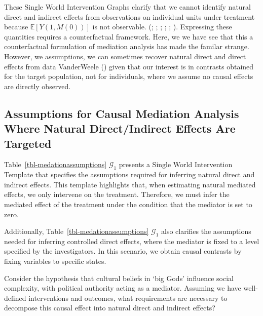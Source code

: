 \documentclass[
  single column]{article}
\begin{document}
These Single World Intervention Graphs clarify that we cannot identify
natural direct and indirect effects from observations on individual
units under treatment because \(\mathbb{E}[Y(1, M(0))]\) is not
observable. (;
;
;
;
;
).
Expressing these quantities requires a counterfactual framework. Here,
we we have see that this a counterfactual formulation of mediation
analysis has made the familar strange. However, we assumptions, we can
sometimes recover natural direct and direct effects from data
VanderWeele () given that our
interest is in contrasts obtained for the target population, not for
individuals, where we assume no causal effects are directly observed.

\subsection{Assumptions for Causal Mediation Analysis Where Natural
Direct/Indirect Effects Are
Targeted}\label{assumptions-for-causal-mediation-analysis-where-natural-directindirect-effects-are-targeted}

Table~\ref{tbl-medationassumptions} \(\mathcal{G}_1\) presents a Single
World Intervention Template that specifies the assumptions required for
inferring natural direct and indirect effects. This template highlights
that, when estimating natural mediated effects, we only intervene on the
treatment. Therefore, we must infer the mediated effect of the treatment
under the condition that the mediator is set to zero.

Additionally, Table~\ref{tbl-medationassumptions} \(\mathcal{G}_1\) also
clarifies the assumptions needed for inferring controlled direct
effects, where the mediator is fixed to a level specified by the
investigators. In this scenario, we obtain causal contrasts by fixing
variables to specific states.

Consider the hypothesis that cultural beliefs in `big Gods' influence
social complexity, with political authority acting as a mediator.
Assuming we have well-defined interventions and outcomes, what
requirements are necessary to decompose this causal effect into natural
direct and indirect effects?
\end{document}
